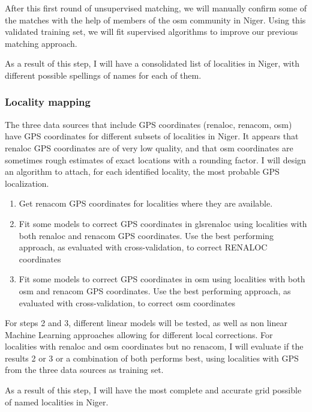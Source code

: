 After this first round of unsupervised matching, we will manually confirm some of the matches with the help of members of the \gls{osm} community in Niger. Using this validated training set, we will fit supervised algorithms to improve our previous matching approach.

As a result of this step, I will have a consolidated list of localities in Niger, with different possible spellings of names for each of them.

\subsubsection{Locality mapping}

The three data sources that include GPS coordinates (\gls{renaloc}, \gls{renacom}, \gls{osm}) have GPS coordinates for different subsets of localities in Niger. It appears that \gls{renaloc} GPS coordinates are of very low quality, and that \gls{osm} coordinates are sometimes rough estimates of exact locations with a rounding factor. I will design an algorithm to attach, for each identified locality, the most probable GPS localization.

\begin{enumerate}
\item Get \gls{renacom} GPS coordinates for localities where they are available.
\item Fit some models to correct GPS coordinates in gls{renaloc} using localities with both \gls{renaloc} and \gls{renacom} GPS coordinates. Use the best performing approach, as evaluated with cross-validation, to correct RENALOC coordinates
\item Fit some models to correct GPS coordinates in \gls{osm} using localities with both \gls{osm} and \gls{renacom} GPS coordinates. Use the best performing approach, as evaluated with cross-validation, to correct \gls{osm} coordinates
\end{enumerate}

For steps 2 and 3, different linear models will be tested, as well as non linear Machine Learning approaches allowing for different local corrections. For localities with \gls{renaloc} and \gls{osm} coordinates but no \gls{renacom}, I will evaluate if the results 2 or 3 or a combination of both performs best, using localities with GPS from the three data sources as training set.

As a result of this step, I will have the most complete and accurate grid possible of named localities in Niger.

